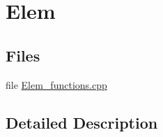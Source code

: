 \hypertarget{group__elem}{\section{Elem}
\label{group__elem}
}
\subsection*{Files}
\begin{DoxyCompactItemize}
\item 
file \hyperlink{Elem__functions_8cpp}{Elem\-\_\-functions.\-cpp}
\end{DoxyCompactItemize}


\subsection{Detailed Description}
